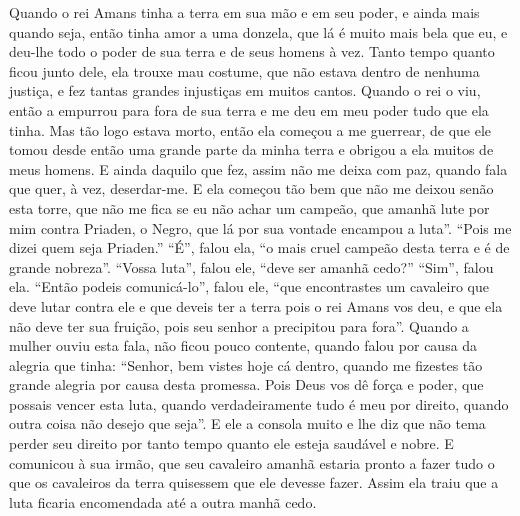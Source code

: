  Quando o rei Amans tinha a terra em sua mão e em seu poder, e ainda mais quando
seja, então tinha amor a uma donzela, que lá é muito mais bela que eu, e
deu-lhe todo o poder de sua terra e de seus homens à vez. Tanto tempo quanto
ficou junto dele, ela trouxe mau costume, que não estava dentro de nenhuma
justiça, e fez tantas grandes injustiças em muitos cantos. Quando o rei o viu,
então a empurrou para fora de sua terra e me deu em meu poder tudo que ela
tinha. Mas tão logo estava morto, então ela começou a me guerrear, de que ele
tomou desde então uma grande parte da minha terra e obrigou a ela muitos de
meus homens. E ainda daquilo que fez, assim não me deixa com paz, quando fala
que quer, à vez, deserdar-me. E ela começou tão bem que não me deixou senão
esta torre, que não me fica se eu não achar um campeão, que amanhã lute por mim
contra Priaden, o Negro, que lá por sua vontade encampou a luta”. “Pois me
dizei quem seja Priaden.” “É”, falou ela, “o mais cruel campeão desta terra e é
de grande nobreza”. “Vossa luta”, falou ele, “deve ser amanhã cedo?” “Sim”,
falou ela. “Então podeis comunicá-lo”, falou ele, “que encontrastes um
cavaleiro que deve lutar contra ele e que deveis ter a terra pois o rei Amans
vos deu, e que ela não deve ter sua fruição, pois seu senhor a precipitou para
fora”. Quando a mulher ouviu esta fala, não ficou pouco contente, quando falou
por causa da alegria que tinha: “Senhor, bem vistes hoje cá dentro, quando me
fizestes tão grande alegria por causa desta promessa. Pois Deus vos dê força e
poder, que possais vencer esta luta, quando verdadeiramente tudo é meu por
direito, quando outra coisa não desejo que seja”. E ele a consola muito e lhe
diz que não tema perder seu direito por tanto tempo quanto ele esteja saudável
e nobre. E comunicou à sua irmão, que seu cavaleiro amanhã estaria pronto a
fazer tudo o que os cavaleiros da terra quisessem que ele devesse fazer. Assim
ela traiu que a luta ficaria encomendada até a outra manhã cedo. 

